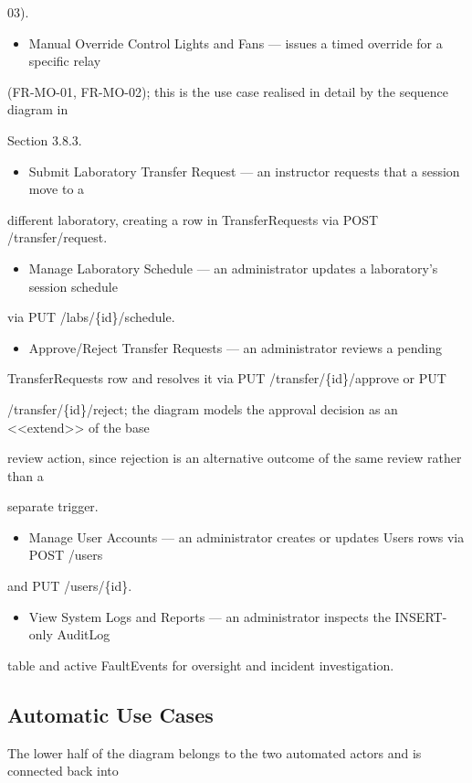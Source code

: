 03).

\begin{itemize}
	\item Manual Override Control Lights and Fans --- issues a timed override for a specific relay
\end{itemize}
(FR-MO-01, FR-MO-02); this is the use case realised in detail by the sequence diagram in

Section 3.8.3.

\begin{itemize}
	\item Submit Laboratory Transfer Request --- an instructor requests that a session move to a
\end{itemize}
different laboratory, creating a row in TransferRequests via POST /transfer/request.

\begin{itemize}
	\item Manage Laboratory Schedule --- an administrator updates a laboratory's session schedule
\end{itemize}
via PUT /labs/\{id\}/schedule.

\begin{itemize}
	\item Approve/Reject Transfer Requests --- an administrator reviews a pending
\end{itemize}
TransferRequests row and resolves it via PUT /transfer/\{id\}/approve or PUT

/transfer/\{id\}/reject; the diagram models the approval decision as an <<extend>> of the base

review action, since rejection is an alternative outcome of the same review rather than a

separate trigger.

\begin{itemize}
	\item Manage User Accounts --- an administrator creates or updates Users rows via POST /users
\end{itemize}
and PUT /users/\{id\}.

\begin{itemize}
	\item View System Logs and Reports --- an administrator inspects the INSERT-only AuditLog
\end{itemize}
table and active FaultEvents for oversight and incident investigation.


\subsection{Automatic Use Cases}
The lower half of the diagram belongs to the two automated actors and is connected back into

